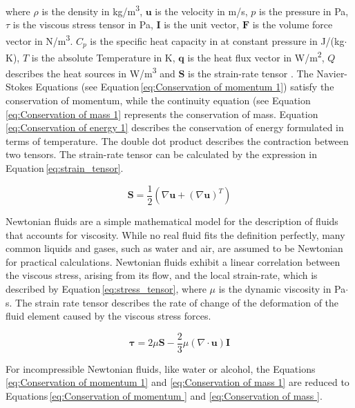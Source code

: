 where $\rho$ is the density in kg/m\textsuperscript{3}, $\boldsymbol u$ is the velocity in m/s, $p$ is the pressure in Pa, $\tau$ is the viscous stress tensor in Pa, $\boldsymbol I$ is the unit vector, $\boldsymbol F$ is the volume force vector in N/m\textsuperscript{3}. $C_{p}$ is the specific heat capacity in at constant pressure in J/(kg$\cdotp$K), $T$ is the absolute Temperature in K, $\boldsymbol q$ is the heat flux vector in W/m\textsuperscript{2}, $Q$ describes the heat sources in W/m\textsuperscript{3} and $\boldsymbol S$ is the strain-rate tensor \cite{ComsolRefManual}. The Navier-Stokes Equations (see Equation\,\ref{eq:Conservation of momentum 1}) satisfy the conservation of momentum, while the continuity equation (see Equation\,\ref{eq:Conservation of mass 1} represents the conservation of mass. Equation\,\ref{eq:Conservation of energy 1} describes the conservation of energy formulated in terms of temperature. The double dot product describes the contraction between two tensors. The strain-rate tensor can be calculated by the expression in Equation\,\ref{eq:strain_tensor}\cite{ComsolRefManual}.

\begin{equation}
\boldsymbol S = \frac{1}{2}(\nabla\boldsymbol u+(\nabla\boldsymbol u)^{T})
\label{eq:strain_tensor}
\end{equation}

Newtonian fluids are a simple mathematical model for the description of fluids that accounts for viscosity. While no real fluid fits the definition perfectly, many common liquids and gases, such as water and air, are assumed to be Newtonian for practical calculations. Newtonian fluids exhibit a linear correlation between the viscous stress, arising from its flow, and the local strain-rate, which is described by Equation\,\ref{eq:stress_tensor}, where $\mu$ is the dynamic viscosity in Pa$\cdotp$s. The strain rate tensor describes the rate of change of the deformation of the fluid element caused by the viscous stress forces.

\begin{equation}
\boldsymbol\tau = 2\mu\boldsymbol S - \frac{2}{3}\mu(\nabla\cdotp\boldsymbol u)\boldsymbol I
\label{eq:stress_tensor}
\end{equation}

For incompressible Newtonian fluids, like water or alcohol, the Equations\,\ref{eq:Conservation of momentum 1} and \ref{eq:Conservation of mass 1} are reduced to Equations\,\ref{eq:Conservation of momentum } and \ref{eq:Conservation of mass }\cite{versteeg2007introduction}. 

